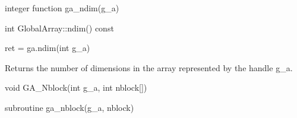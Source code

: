 \documentclass[10pt]{article}
\begin{document}
\begin{fapi}
\begin{fcode}
integer function ga_ndim(g_a)
\end{fcode}
\begin{funcargs}
\end{funcargs}
\end{fapi}

\begin{cxxapi}
\begin{cxxcode}
int GlobalArray::ndim() const
\end{cxxcode}
\end{cxxapi}

\begin{pyapi}
\begin{pycode}
ret = ga.ndim(int g_a)
\end{pycode}
\begin{funcargs}
\end{funcargs}
\end{pyapi}

\local

\begin{desc}

Returns the number of dimensions in the array represented by the handle g_a.

\end{desc}


\begin{capi}
\begin{ccode}
void GA_Nblock(int g_a, int nblock[])
\end{ccode}
\begin{funcargs}
\end{funcargs}
\end{capi}

\begin{fapi}
\begin{fcode}
subroutine ga_nblock(g_a, nblock)
\end{fcode}
\begin{funcargs}
\end{funcargs}
\end{fapi}
\end{document}
